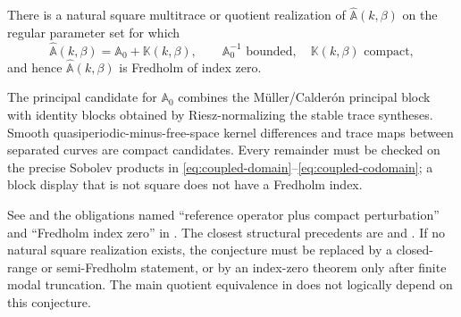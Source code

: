 \begin{conjecture}
\label{conj:Fredholm}
There is a natural square multitrace or quotient realization of
$\widehat{\mathbb A}(k,\beta)$ on the regular parameter set for which
\begin{equation}
  \widehat{\mathbb A}(k,\beta)
  =\mathbb A_0+\mathbb K(k,\beta),
  \qquad \mathbb A_0^{-1}\text{ bounded},\quad
  \mathbb K(k,\beta)\text{ compact},
  \label{eq:Fredholm-splitting}
\end{equation}
and hence $\widehat{\mathbb A}(k,\beta)$ is Fredholm of index zero.
\end{conjecture}
\begin{proofroadmap}
The principal candidate for $\mathbb A_0$ combines the M\"uller/Calder\'on
principal block with identity blocks obtained by Riesz-normalizing the stable
trace syntheses.  Smooth quasiperiodic-minus-free-space kernel differences and
trace maps between separated curves are compact candidates.  Every remainder
must be checked on the precise Sobolev products in
\eqref{eq:coupled-domain}--\eqref{eq:coupled-codomain}; a block display that is
not square does not have a Fredholm index.

See  and
the obligations named ``reference operator plus compact perturbation'' and
``Fredholm index zero'' in
.  The closest
structural precedents are \cite[Theorem~4]{BarnettGreengard2010} and
\cite[Lemma~5.1]{HohageSoussi2013}.  If no natural square realization exists,
the conjecture must be replaced by a closed-range or semi-Fredholm statement,
or by an index-zero theorem only after finite modal truncation.  The main
quotient equivalence in  does not logically
depend on this conjecture.
\end{proofroadmap}
